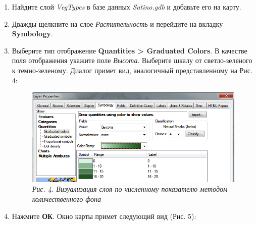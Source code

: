 \documentclass[]{book}
\theoremstyle{definition}
\theoremstyle{definition}
\theoremstyle{definition}
\theoremstyle{remark}
\begin{document}
\begin{enumerate}
\def\labelenumi{\arabic{enumi}.}
\item
  Найдите слой \emph{VegTypes} в базе данных \emph{Satino.gdb} и
  добавьте его на карту.
\item
  Дважды щелкните на слое \emph{Растительность} и перейдите на вкладку
  \textbf{Symbology}.
\item
  Выберите тип отображение \textbf{Quantities \textgreater{} Graduated
  Colors}. В качестве поля отображения укажите поле \emph{Высота}.
  Выберите шкалу от светло-зеленого к темно-зеленому. Диалог примет вид,
  аналогичный представленному на Рис. 4:

  \begin{figure}
  \centering
  \includegraphics{images/Ex18/image5.png}
  \caption{\emph{Рис. 4. Визуализация слоя по численному показателю
  методом количественного фона}}
  \end{figure}
\item
  Нажмите \textbf{ОК}. Окно карты примет следующий вид (Рис. 5):


\end{enumerate}
\end{document}
